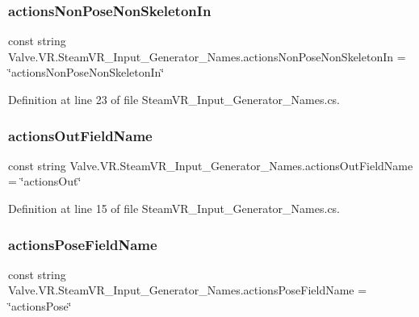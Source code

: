 \subsubsection{\texorpdfstring{actionsNonPoseNonSkeletonIn}{actionsNonPoseNonSkeletonIn}}
{\footnotesize\ttfamily const string Valve.\+V\+R.\+Steam\+V\+R\+\_\+\+Input\+\_\+\+Generator\+\_\+\+Names.\+actions\+Non\+Pose\+Non\+Skeleton\+In = \char`\"{}actions\+Non\+Pose\+Non\+Skeleton\+In\char`\"{}}



Definition at line 23 of file Steam\+V\+R\+\_\+\+Input\+\_\+\+Generator\+\_\+\+Names.\+cs.

\mbox{\label{class_valve_1_1_v_r_1_1_steam_v_r___input___generator___names_a58d75553f5715c6c5ea1bb8ce81a8966}} 
\subsubsection{\texorpdfstring{actionsOutFieldName}{actionsOutFieldName}}
{\footnotesize\ttfamily const string Valve.\+V\+R.\+Steam\+V\+R\+\_\+\+Input\+\_\+\+Generator\+\_\+\+Names.\+actions\+Out\+Field\+Name = \char`\"{}actions\+Out\char`\"{}}



Definition at line 15 of file Steam\+V\+R\+\_\+\+Input\+\_\+\+Generator\+\_\+\+Names.\+cs.

\mbox{\label{class_valve_1_1_v_r_1_1_steam_v_r___input___generator___names_abfeeab00b38a1f55a07f989b7398f2be}} 
\subsubsection{\texorpdfstring{actionsPoseFieldName}{actionsPoseFieldName}}
{\footnotesize\ttfamily const string Valve.\+V\+R.\+Steam\+V\+R\+\_\+\+Input\+\_\+\+Generator\+\_\+\+Names.\+actions\+Pose\+Field\+Name = \char`\"{}actions\+Pose\char`\"{}}



